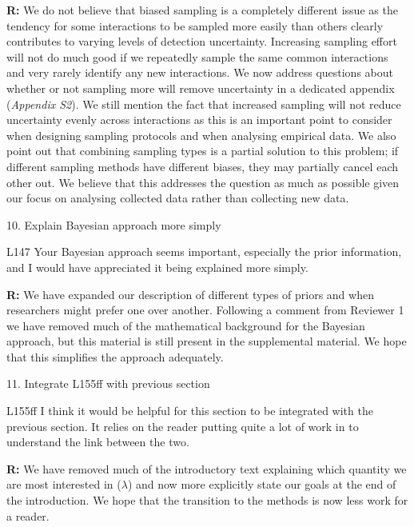 \documentclass[12pt]{letter}
\newenvironment{refquote}{\bigskip \begin{it}}{\end{it}\smallskip}
\begin{document}
		\textbf{R:} We do not believe that biased sampling is a completely different issue as the tendency for some interactions to be sampled more easily than others clearly contributes to varying levels of detection uncertainty. Increasing sampling effort will not do much good if we repeatedly sample the same common interactions and very rarely identify any new interactions. We now address questions about whether or not sampling more will remove uncertainty in a dedicated appendix (\emph{Appendix S2}). We still mention the fact that increased sampling will not reduce uncertainty evenly across interactions as this is an important point to consider when designing sampling protocols and when analysing empirical data. We also point out that combining sampling types is a partial solution to this problem; if different sampling methods have different biases, they may partially cancel each other out. We believe that this addresses the question as much as possible given our focus on analysing collected data rather than collecting new data.


	10. Explain Bayesian approach more simply


		\begin{refquote}
		L147 Your Bayesian approach seems important, especially the prior information, and I would have appreciated it being explained more simply.
		\end{refquote}


		\textbf{R:} We have expanded our description of different types of priors and when researchers might prefer one over another. Following a comment from Reviewer 1 we have removed much of the mathematical background for the Bayesian approach, but this material is still present in the supplemental material. We hope that this simplifies the approach adequately.


	11. Integrate L155ff with previous section


		\begin{refquote}
		L155ff I think it would be helpful for this section to be integrated with the previous section. It relies on the reader putting quite a lot of work in to understand the link between the two.
		\end{refquote}


		\textbf{R:} We have removed much of the introductory text explaining which quantity we are most interested in ($\lambda$) and now more explicitly state our goals at the end of the introduction. We hope that the transition to the methods is now less work for a reader.
\end{document}
